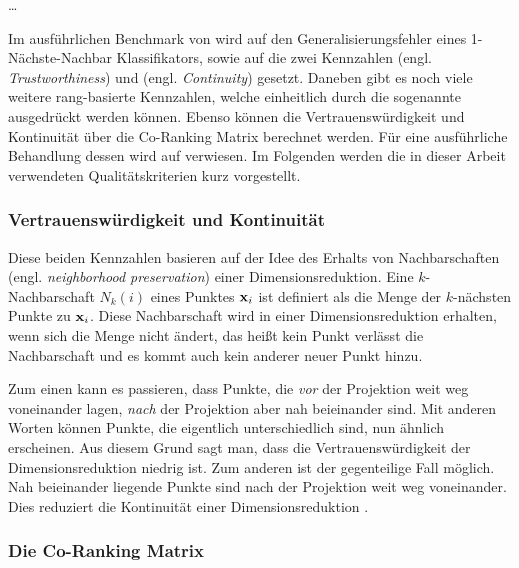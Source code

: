 \ldots
{}

Im ausführlichen Benchmark von \textcite{vanderMaaten.2009} wird auf den Generalisierungsfehler
eines 1-Nächste-Nachbar Klassifikators, sowie auf die zwei Kennzahlen
 (engl. \textit{Trustworthiness}) und  (engl.
\textit{Continuity}) \parencites{Venna.2001}{Venna.2006} gesetzt. Daneben gibt es noch viele weitere rang-basierte
Kennzahlen, welche einheitlich durch die sogenannte  ausgedrückt werden
können. Ebenso können die Vertrauenswürdigkeit und Kontinuität über die Co-Ranking Matrix berechnet
werden. Für eine ausführliche Behandlung dessen wird auf \textcite{Lee.2009} verwiesen. Im
Folgenden werden die in dieser Arbeit verwendeten Qualitätskriterien kurz vorgestellt.

\subsubsection{Vertrauenswürdigkeit und Kontinuität}
Diese beiden Kennzahlen basieren auf der Idee des Erhalts von Nachbarschaften (engl.
\textit{neighborhood preservation}) einer Dimensionsreduktion. Eine $k$-Nachbarschaft $N_k(i)$
eines Punktes $\mathbf{x}_i$ ist definiert als die Menge der $k$-nächsten Punkte zu $\mathbf{x}_i$.
Diese Nachbarschaft wird in einer Dimensionsreduktion erhalten, wenn sich die Menge nicht ändert,
das heißt kein Punkt verlässt die Nachbarschaft und es kommt auch kein anderer neuer Punkt hinzu.

Zum einen kann es passieren, dass Punkte, die \textit{vor} der Projektion weit weg voneinander
lagen, \textit{nach} der Projektion aber nah beieinander sind. Mit anderen Worten können Punkte,
die eigentlich unterschiedlich sind, nun ähnlich erscheinen. Aus diesem Grund sagt man, dass die
Vertrauenswürdigkeit der Dimensionsreduktion niedrig ist. Zum anderen ist der gegenteilige Fall
möglich. Nah beieinander liegende Punkte sind nach der Projektion weit weg voneinander. Dies
reduziert die Kontinuität einer Dimensionsreduktion \parencite[486 -- 487]{Venna.2001}.

\subsubsection{Die Co-Ranking Matrix}

